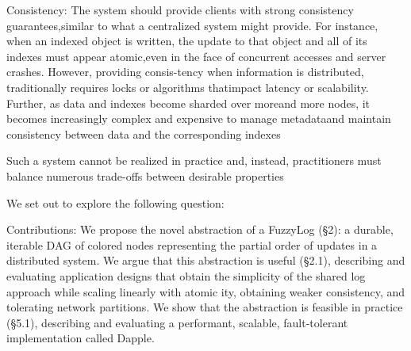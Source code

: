 Consistency: The system should provide clients with strong consistency guarantees,similar to what a centralized system might provide.  For instance, when an indexed object is written, the update to that object and all of its indexes must appear atomic,even in the face of concurrent accesses and server crashes.  However, providing consis-tency when information is distributed, traditionally requires locks or algorithms thatimpact latency or scalability.  Further, as data and indexes become sharded over moreand more nodes, it becomes increasingly complex and expensive to manage metadataand maintain consistency between data and the corresponding indexes

Such a system cannot be realized in practice and, instead, practitioners must balance numerous trade-offs between desirable properties


%
We set out to explore the following question:


Contributions: We propose the novel abstraction of a FuzzyLog (§2): a durable, iterable DAG of colored nodes representing the partial order of updates in a distributed system. We argue that this abstraction is useful (§2.1), describing and evaluating application designs that obtain the simplicity of the shared log approach while scaling linearly with atomic­ ity, obtaining weaker consistency, and tolerating network partitions. We show that the abstraction is feasible in practice (§5.1), describing and evaluating a performant, scalable, fault-tolerant implementation called Dapple.



